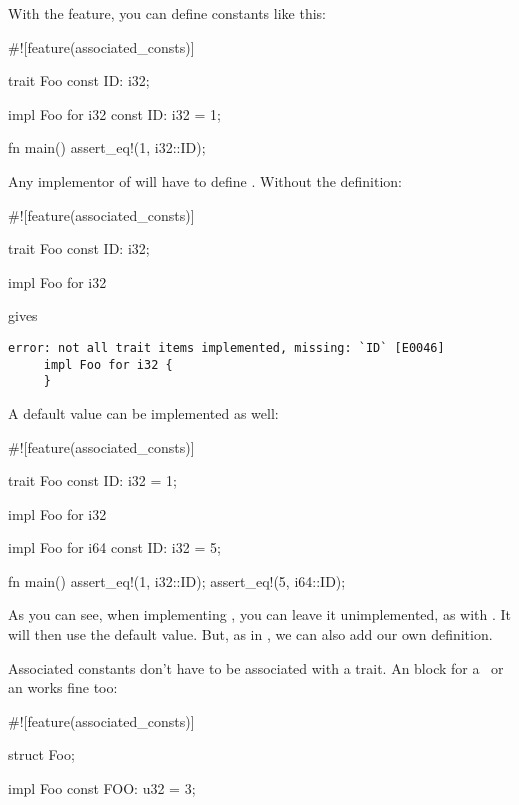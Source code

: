 With the  feature, you can define constants like this:

\begin{rustc}
#![feature(associated_consts)]

trait Foo {
    const ID: i32;
}

impl Foo for i32 {
    const ID: i32 = 1;
}

fn main() {
    assert_eq!(1, i32::ID);
}
\end{rustc}

Any implementor of  will have to define . Without the definition:

\begin{rustc}
#![feature(associated_consts)]

trait Foo {
    const ID: i32;
}

impl Foo for i32 {
}
\end{rustc}

gives

\begin{verbatim}
error: not all trait items implemented, missing: `ID` [E0046]
     impl Foo for i32 {
     }
\end{verbatim}

A default value can be implemented as well:

\begin{rustc}
#![feature(associated_consts)]

trait Foo {
    const ID: i32 = 1;
}

impl Foo for i32 {
}

impl Foo for i64 {
    const ID: i32 = 5;
}

fn main() {
    assert_eq!(1, i32::ID);
    assert_eq!(5, i64::ID);
}
\end{rustc}

As you can see, when implementing , you can leave it unimplemented, as with \itt. It will then use the default value. 
But, as in , we can also add our own definition.

\blank

Associated constants don't have to be associated with a trait. An  block for a \struct\ or an  works fine too:

\begin{rustc}
#![feature(associated_consts)]

struct Foo;

impl Foo {
    const FOO: u32 = 3;
}
\end{rustc}
